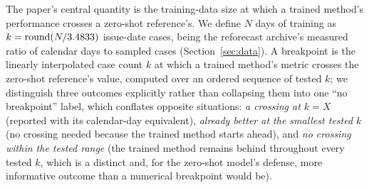 The paper's central quantity is the training-data size at which a trained
method's performance crosses a zero-shot reference's. We define \(N\) days
of training as \(k = \mathrm{round}(N / 3.4833)\) issue-date cases,
\DaysPerCase{} being the reforecast archive's measured ratio of calendar
days to sampled cases (Section~\ref{sec:data}). A breakpoint is
the linearly interpolated case count \(k\) at which a trained method's
metric crosses the zero-shot reference's value, computed over an ordered
sequence of tested \(k\); we distinguish three outcomes explicitly rather
than collapsing them into one ``no breakpoint'' label, which conflates
opposite situations: \emph{a crossing at \(k=X\)} (reported with its
calendar-day equivalent), \emph{already better at the smallest tested
\(k\)} (no crossing needed because the trained method starts ahead), and
\emph{no crossing within the tested range} (the trained method remains
behind throughout every tested \(k\), which is a distinct and, for the
zero-shot model's defense, more informative outcome than a numerical
breakpoint would be).
